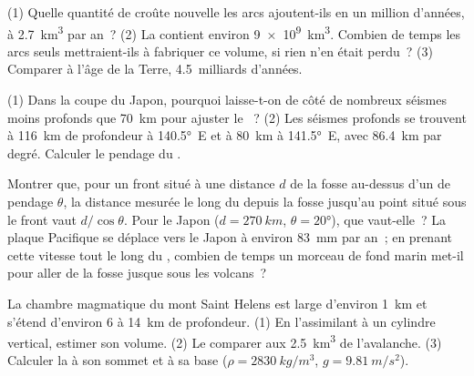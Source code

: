 \begin{exercise}[$\star\star$]\label{exo:g12:subduction-magmatism:10}
(1) Quelle quantité de croûte nouvelle les arcs ajoutent-ils en un million
d'années, à \qty{2.7}{km^3} par an~? (2) La  contient
environ \qty{9e9}{km^3}. Combien de temps les arcs seuls mettraient-ils à
fabriquer ce volume, si rien n'en était perdu~? (3) Comparer à l'âge de la
Terre, 4.5~milliards d'années.
\end{exercise}

\begin{exercise}[$\star\star$]\label{exo:g12:subduction-magmatism:11}
(1) Dans la coupe du Japon, pourquoi laisse-t-on de côté de nombreux
séismes moins profonds que \qty{70}{km} pour ajuster le ~?
(2) Les séismes profonds se trouvent à \qty{116}{km} de profondeur à
\ang{140.5}~E et à \qty{80}{km} à \ang{141.5}~E, avec \qty{86.4}{km} par
degré. Calculer le pendage du .
\end{exercise}

\begin{exercise}[$\star\star\star$]\label{exo:g12:subduction-magmatism:12}
Montrer que, pour un front situé à une distance $d$ de la fosse au-dessus
d'un  de pendage $\theta$, la distance mesurée le long du 
depuis la fosse jusqu'au point situé sous le front vaut $d/\cos\theta$.
Pour le Japon ($d = \qty{270}{km}$, $\theta = \ang{20}$), que vaut-elle~?
La plaque Pacifique se déplace vers le Japon à environ \qty{83}{mm} par
an~; en prenant cette vitesse tout le long du , combien de temps un
morceau de fond marin met-il pour aller de la fosse jusque sous les
volcans~?
\end{exercise}

\begin{exercise}[$\star\star\star$]\label{exo:g12:subduction-magmatism:13}
La chambre magmatique du mont Saint Helens est large d'environ \qty{1}{km}
et s'étend d'environ 6 à \qty{14}{km} de profondeur. (1) En l'assimilant à
un cylindre vertical, estimer son volume. (2) Le comparer aux
\qty{2.5}{km^3} de l'avalanche. (3) Calculer la  à
son sommet et à sa base ($\rho =
\qty{2830}{kg/m^3}$, $g = \qty{9.81}{m/s^2}$).
\end{exercise}

